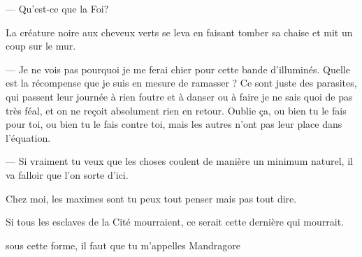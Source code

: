 --- Qu'est-ce que la Foi?

La créature noire aux cheveux verts se leva en faisant tomber sa
chaise et mit un coup sur le mur.

--- Je ne vois pas pourquoi je me ferai chier pour cette bande
d'illuminés. Quelle est la récompense que je suis en mesure de
ramasser ? Ce sont juste des parasites, qui passent leur journée à
rien foutre et à danser ou à faire je ne sais quoi de pas très féal,
et on ne reçoit absolument rien en retour. Oublie ça, ou bien tu le
fais pour toi, ou bien tu le fais contre toi, mais les autres n'ont
pas leur place dans l'équation.

--- Si vraiment tu veux que les choses coulent de manière un minimum
naturel, il va falloir que l'on sorte d'ici.

Chez moi, les maximes sont tu peux tout penser mais pas tout dire.

Si tous les esclaves de la Cité mourraient, ce serait cette dernière
qui mourrait.


sous cette forme, il faut que tu m'appelles Mandragore

